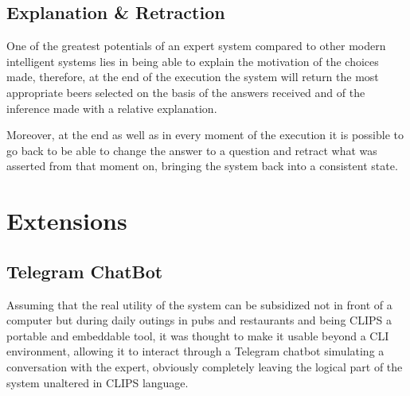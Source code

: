 \documentclass[12pt]{article}
\begin{document}
\subsection{Explanation \& Retraction}

One of the greatest potentials of an expert system compared to other modern intelligent systems lies in being able to explain the motivation of the choices made, therefore, at the end of the execution the system will return the most appropriate beers selected on the basis of the answers received and of the inference made with a relative explanation.

Moreover, at the end as well as in every moment of the execution it is possible to go back to be able to change the answer to a question and retract what was asserted from that moment on, bringing the system back into a consistent state.

\newpage
\section{Extensions}

\subsection{Telegram ChatBot}
Assuming that the real utility of the system can be subsidized not in front of a computer but during daily outings in pubs and restaurants and being CLIPS a portable and embeddable tool, it was thought to make it usable beyond a CLI environment, allowing it to interact through a Telegram chatbot simulating a conversation with the expert, obviously completely leaving the logical part of the system unaltered in CLIPS language.
\end{document}
